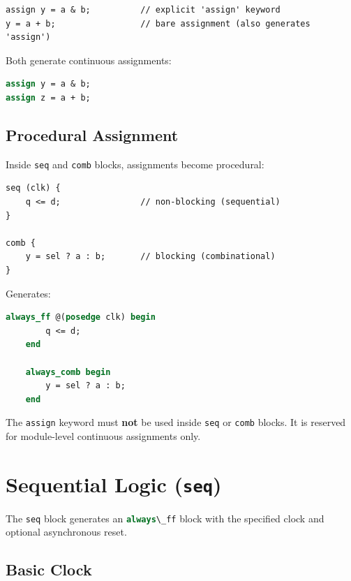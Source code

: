 \documentclass[lang=en,11pt]{elegantbook}
\newcommand{\code}[1]{\texttt{#1}}
\newcommand{\svinline}[1]{\lstinline[language=SystemVerilog]|#1|}
\begin{document}
\begin{lstlisting}[language=Slip]
assign y = a & b;          // explicit 'assign' keyword
y = a + b;                 // bare assignment (also generates 'assign')
\end{lstlisting}

Both generate continuous assignments:

\begin{lstlisting}[language=SystemVerilog]
assign y = a & b;
assign z = a + b;
\end{lstlisting}

\section{Procedural Assignment}

Inside \code{seq} and \code{comb} blocks, assignments become procedural:

\begin{lstlisting}[language=Slip]
seq (clk) {
    q <= d;                // non-blocking (sequential)
}

comb {
    y = sel ? a : b;       // blocking (combinational)
}
\end{lstlisting}

Generates:

\begin{lstlisting}[language=SystemVerilog]
    always_ff @(posedge clk) begin
        q <= d;
    end

    always_comb begin
        y = sel ? a : b;
    end
\end{lstlisting}

\begin{remark}
The \code{assign} keyword must \textbf{not} be used inside \code{seq} or \code{comb} blocks. It is reserved for module-level continuous assignments only.
\end{remark}

\chapter{Sequential Logic (\code{seq})}

The \code{seq} block generates an \svinline{always\_ff} block with the specified clock and optional asynchronous reset.

\section{Basic Clock}
\end{document}
